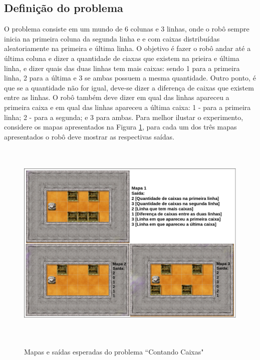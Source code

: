 \subsection{Definição do problema}
\label{sub:subdefprob}
O problema consiste em um mundo de 6 colunas e 3 linhas, onde o robô sempre inicia na primeira coluna da segunda linha e e com caixas distribuídas aleatoriamente na primeira e última linha. O objetivo é fazer o robô andar até a última coluna e dizer a quantidade de ciaxas que existem na prieira e última linha, e dizer quais das duas linhas tem mais caixas: sendo 1 para a primeira linha, 2 para a última e 3 se ambas possuem a mesma quantidade. Outro ponto, é que se a quantidade não for igual, deve-se dizer a diferença de caixas que existem entre as linhas. O robô também deve dizer em qual das linhas apareceu a primeira caixa e em qual das linhas apareceu a última caixa: 1 - para a primeira linha; 2 - para a segunda; e 3 para ambas. Para melhor ilustar o experimento, considere os mapas apresentados na Figura \ref{fig:problem}, para cada um dos três mapas apresentados o robô deve mostrar as respectivas saídas.

\begin{figure}[h]
\centering
\caption{Mapas e saídas esperadas do problema ``Contando Caixas"}
\includegraphics[height=10cm]{figuras/problema.png}
\label{fig:problem}
\end{figure}

